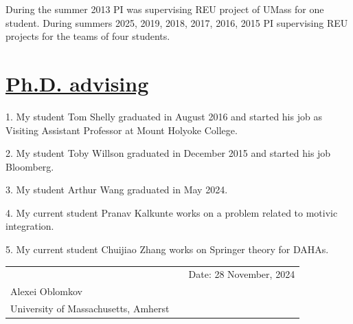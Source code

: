 \documentclass[11pt]{amsart}
\theoremstyle{plain}
\theoremstyle{definition}
\theoremstyle{remark}
\begin{document}

\medskip

\noindent During the summer 2013 PI was supervising REU project of
UMass for one student. During summers 2025, 2019, 2018, 2017, 2016, 2015 PI supervising
REU projects for the teams of four students. 

\newpage

\section*{\Large \underline{Ph.D. advising}}

\medskip

1. My student Tom Shelly graduated in August 2016 and started his job as Visiting Assistant Professor at Mount Holyoke College. 

2. My student Toby Willson graduated in December 2015 and started his job Bloomberg. 

3. My  student Arthur Wang graduated in May 2024.

4. My current student Pranav Kalkunte works on a problem related to motivic integration.

5. My current student Chuijiao Zhang works on  Springer theory for DAHAs.




\vspace{25mm}
\begin{tabular}{@{}p{2.5in}p{1.5in}p{2in}@{}}
\hrulefill && Date: 28 November, 2024\\
Alexei Oblomkov &&\\
University of Massachusetts, Amherst
\end{tabular}
\end{document}

